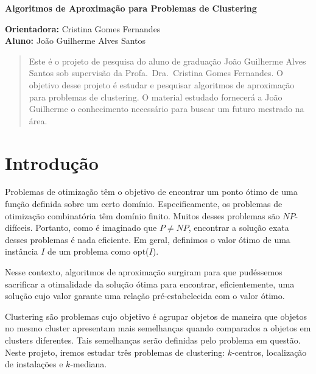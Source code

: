 \documentclass[12pt]{article}
\newcommand{\opt}{\ensuremath{\mathrm{opt}}}
\newcommand{\NP}{\mathit{NP}}
\begin{document}
\begin{center}
  
{\Large {\bf Algoritmos de Aproximação para Problemas de Clustering}
}

\vspace{0.2cm}
{\small 
{\bf Orientadora:} Cristina Gomes Fernandes \\
{\bf Aluno:} João Guilherme Alves Santos
}

\vspace{5mm} 

\begin{abstract}
Este é o projeto de pesquisa do aluno de graduação João Guilherme Alves Santos sob supervisão da Profa.\ Dra.\ Cristina Gomes Fernandes. O objetivo desse projeto é estudar e pesquisar algoritmos de aproximação para problemas de clustering. O material estudado fornecerá a João Guilherme o conhecimento necessário para buscar um futuro mestrado na área.
\end{abstract}

\end{center}
\newpage

\tableofcontents

\newpage

\section{Introdução}

Problemas de otimização têm o objetivo de encontrar um ponto ótimo de uma função definida sobre um certo domínio. Especificamente, os problemas de otimização combinatória têm domínio finito. Muitos desses problemas são $\NP$-difíceis. Portanto, como é imaginado que $P\not=\NP$, encontrar a solução exata desses problemas é nada eficiente. Em geral, definimos o valor ótimo de uma instância $I$ de um problema como \opt($I$).

Nesse contexto, algoritmos de aproximação surgiram para que pudéssemos sacrificar a otimalidade da solução ótima para encontrar, eficientemente, uma solução cujo valor garante uma relação pré-estabelecida com o valor ótimo. 

Clustering são problemas cujo objetivo é agrupar objetos de maneira que objetos no mesmo cluster apresentam mais semelhanças quando comparados a objetos em clusters diferentes. Tais semelhanças serão definidas pelo problema em questão. Neste projeto, iremos estudar três problemas de clustering: $k$-centros, localização de instalações e $k$-mediana. 
\end{document}
